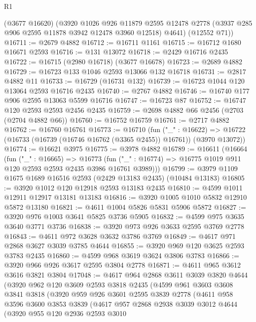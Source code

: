 \begin{lexlean}{R1}
\begin{coremodule}
      (@3677 @16620)
      (@3920
        @1026
        @926
        @11879
        @2595
        @12478
        @2778
        (@3937 @285 @906 @2595 @11878 @3942 @12478 @3960 @12518)
        @4641)
      (@12552 @71))
@16711 := @2679 @4882
@16712 := @16711 @1161
@16715 := @16712 @1680 @16671 @2593
@16716 := @131 @13072
@16718 := @2429 @16716 @2435
@16722 := @16715 (@2980 @16718) (@3677 @16678)
@16723 := @2689 @4882
@16729 := @16723 @133 @1046 @2593 @13066 @132 @16718
@16731 := @2817 @4882 @11
@16733 := @16729 (@16731 @132)
@16739 := @16723 @1044 @120 @13064 @2593 @16716 @2435
@16740 := @2767 @4882
@16746 := @16740 @177 @906 @2595 @13063 @5599 @16716
@16747 := @16723 @87
@16752 := @16747 @120 @2593 @2593 @2456 @2435
@16759 := @2698 @4882 @66 @2456 (@2703 (@2704 @4882 @66))
@16760 := @16752 @16759
@16761 := @2717 @4882
@16762 := @16760 @16761
@16773 := @16710
    (fun ("_" : @16622) =>
    @16722 (@16733 (@16739 (@16746 @16762 (@3365 @2455)) @16761)) (@3970 @13072))
@16774 := @16621 @3975
@16775 := @3978 @4882
@16789 := @16611
    (@16664
      (fun ("_" : @16665) =>
      @16773 (fun ("_" : @16774) => @16775 @1019 @911 @120 @2593 @2593 @2435 @3986 @16761 @3989)))
@16799 := @3979 @1109 @1675 @1689 @16516 @2593 (@2429 @13183 @2435) (@10484 @13183)
@16805 := @3920 @1012 @120 @12918 @2593 @13183 @2435
@16810 := @4599 @1011 @12911 @12917 @13181 @13183
@16816 := @3920 @1005 @1010 @5832 @12910 @5872 @13180
@16821 := @4611 @1004 @5826 @5831 @5906 @5872
@16827 := @3920 @976 @1003 @3641 @5825 @3736 @5905
@16832 := @4599 @975 @3635 @3640 @3771 @3736
@16838 := @3920 @973 @926 @3633 @2595 @3769 @2778
@16843 := @4611 @972 @3628 @3632 @3786 @3769
@16849 := @4617 @971 @2868 @3627 @3039 @3785 @4644
@16855 := @3920 @969 @120 @3625 @2593 @3783 @2435
@16860 := @4599 @968 @3619 @3624 @3806 @3783
@16866 := @3920 @966 @926 @3617 @2595 @3804 @2778
@16871 := @4611 @965 @3612 @3616 @3821 @3804
@17048 := @4617
    @964
    @2868
    @3611
    @3039
    @3820
    @4644
    (@3920
      @962
      @120
      @3609
      @2593
      @3818
      @2435
      (@4599
        @961
        @3603
        @3608
        @3841
        @3818
        (@3920
          @959
          @926
          @3601
          @2595
          @3839
          @2778
          (@4611
            @958
            @3596
            @3600
            @3853
            @3839
            (@4617
              @957
              @2868
              @2938
              @3039
              @3012
              @4644
              (@3920
                @955
                @120
                @2936
                @2593
                @3010

\end{coremodule}
\end{lexlean}
